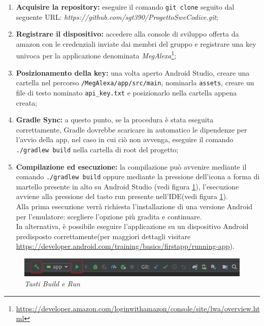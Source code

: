 \begin{enumerate}
	\item \textbf{Acquisire la repository:} eseguire il comando \texttt{git clone} seguito dal seguente URL: \textit{https://github.com/sgt390/ProgettoSweCodice.git};
	\item \textbf{Registrare il dispositivo:} accedere alla console di sviluppo offerta da amazon con le credenziali inviate dai membri del gruppo e registrare una key univoca per la applicazione denominata \textit{MegAlexa}\footnote{\url{https://developer.amazon.com/loginwithamazon/console/site/lwa/overview.html}};
	\item \textbf{Posizionamento della key:} una volta aperto Android Studio, creare una cartella nel percorso \texttt{/MegAlexa/app/src/main}, nominarla \texttt{assets}, creare un file di testo nominato \texttt{api\_key.txt} e posizionarlo nella cartella appena creata;
	\item \textbf{Gradle Sync:} a questo punto, se la procedura è stata eseguita correttamente, Gradle dovrebbe scaricare in automatico le dipendenze per l'avvio della app, nel caso in cui ciò non avvenga, eseguire il comando \texttt{./gradlew build} nella cartella di root del progetto;
	\item\textbf{Compilazione ed esecuzione:} la compilazione può avvenire mediante il comando \texttt{./gradlew build} oppure mediante la pressione dell'icona a forma di martello presente in alto su Android Studio (vedi figura \ref{martello}), l'esecuzione avviene alla pressione del tasto run presente nell'IDE(vedi figura \ref{martello}).\\
	Alla prima esecuzione verrà richiesta l'installazione di una versione Android per l'emulatore: scegliere l'opzione più gradita e continuare.\\
	In alternativa, è possibile eseguire l'applicazione su un dispositivo Android predisposto correttamente(per maggiori dettagli visitare \url{https://developer.android.com/training/basics/firstapp/running-app}). 

	
\end{enumerate}

\begin{figure} [H]
	\centering
	\includegraphics[scale=0.9]{./images/AndroidStudio.PNG}
	\caption{\textit{Tasti Build e Run}}\label{martello}
\end{figure}


